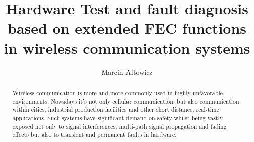 \documentclass[]{myclass}
\author{Marcin Aftowicz}
\title{Hardware Test and fault diagnosis based on extended FEC functions  in wireless communication systems}
\begin{document}


\frontmatter
\pagestyle{empty}%
\maketitle  \cleardoublepage

   \cleardoublepage

\pagestyle{ppfcmthesis}
    \cleardoublepage

\listoffigures  \cleardoublepage
\listoftables   \cleardoublepage

\tableofcontents \cleardoublepage

\mainmatter
 

\begin{abstract}
Wireless communication is more and more commonly used in highly unfavorable environments. Nowadays it's not only cellular communication, but also communication within cities, industrial production facilities and other short distance, real-time applications. Such systems have significant demand on safety whilst being vastly exposed not only to signal interferences, multi-path signal propagation and fading effects but also to transient and permanent faults in hardware. 
\end{abstract}






\cleardoublepage
\appendix%

%
{}
\cleardoublepage


\end{document}
